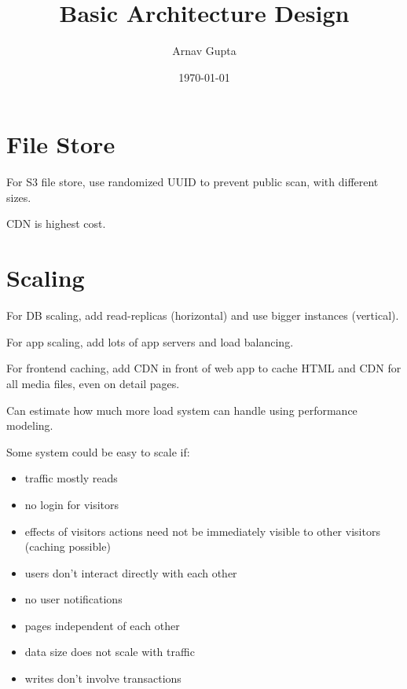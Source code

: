 \documentclass[11pt]{article}
\author{Arnav Gupta}
\date{\today}
\title{Basic Architecture Design}
\begin{document}
\maketitle
\tableofcontents

\section{File Store}
\label{sec:org9a67e29}
For S3 file store, use randomized UUID to prevent public scan, with different sizes.

CDN is highest cost.
\section{Scaling}
\label{sec:orgcc7e57e}
For DB scaling, add read-replicas (horizontal) and use bigger instances (vertical).

For app scaling, add lots of app servers and load balancing.

For frontend caching, add CDN in front of web app to cache HTML and CDN for all media files,
even on detail pages.

Can estimate how much more load system can handle using performance modeling.

Some system could be easy to scale if:
\begin{itemize}
\item traffic mostly reads
\item no login for visitors
\item effects of visitors actions need not be immediately visible to other visitors
(caching possible)
\item users don't interact directly with each other
\item no user notifications
\item pages independent of each other
\item data size does not scale with traffic
\item writes don't involve transactions
\end{itemize}
\end{document}
